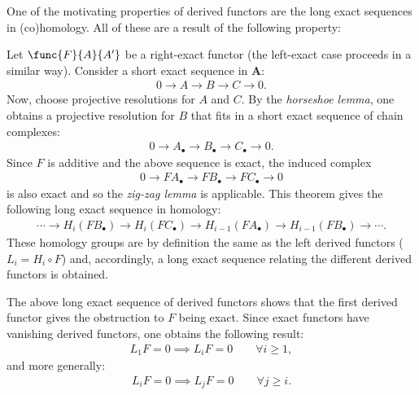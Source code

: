 	One of the motivating properties of derived functors are the long exact sequences in (co)homology. All of these are a result of the following property:
	\begin{property}
		Let $\func{F}{A}{A'}$ be a right-exact functor (the left-exact case proceeds in a similar way). Consider a short exact sequence in $\mathbf{A}$:
		\begin{gather}
			0\longrightarrow A\longrightarrow B\longrightarrow C\longrightarrow 0.
		\end{gather}
		Now, choose projective resolutions for $A$ and $C$. By the \textit{horseshoe lemma}, one obtains a projective resolution for $B$ that fits in a short exact sequence of chain complexes:
		\begin{gather}
			0\longrightarrow A_\bullet\longrightarrow B_\bullet\longrightarrow C_\bullet\longrightarrow 0.
		\end{gather}
		Since $F$ is additive and the above sequence is exact, the induced complex
		\begin{gather}
			0\longrightarrow FA_\bullet\longrightarrow FB_\bullet\longrightarrow FC_\bullet\longrightarrow0
		\end{gather}
		is also exact and so the \textit{zig-zag lemma} is applicable. This theorem gives the following long exact sequence in homology:
		\begin{gather}
			\cdots\longrightarrow H_i(FB_\bullet)\longrightarrow H_i(FC_\bullet) \longrightarrow H_{i-1}(FA_\bullet) \longrightarrow H_{i-1}(FB_\bullet) \longrightarrow\cdots.
		\end{gather}
		These homology groups are by definition the same as the left derived functors ($L_i = H_i\circ F$) and, accordingly, a long exact sequence relating the different derived functors is obtained.
	\end{property}
	\begin{result}
		The above long exact sequence of derived functors shows that the first derived functor gives the obstruction to $F$ being exact. Since exact functors have vanishing derived functors, one obtains the following result:
		\begin{gather}
			L_1F = 0\implies L_iF=0\qquad\forall i\geq 1,
		\end{gather}
        and more generally:
        \begin{gather}
            L_iF = 0\implies L_jF=0\qquad\forall j\geq i.
        \end{gather}
	\end{result}

